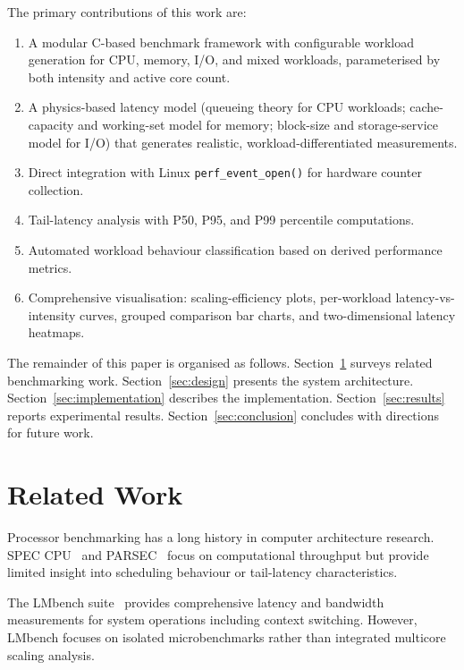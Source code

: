 \documentclass[conference]{IEEEtran}
\begin{document}
The primary contributions of this work are:
\begin{enumerate}
  \item A modular C-based benchmark framework with configurable workload
        generation for CPU, memory, I/O, and mixed workloads, parameterised by
        both intensity and active core count.
  \item A physics-based latency model (queueing theory for CPU workloads;
        cache-capacity and working-set model for memory; block-size and
        storage-service model for I/O) that generates realistic,
        workload-differentiated measurements.
  \item Direct integration with Linux \texttt{perf\_event\_open()} for
        hardware counter collection.
  \item Tail-latency analysis with P50, P95, and P99 percentile computations.
  \item Automated workload behaviour classification based on derived performance
        metrics.
  \item Comprehensive visualisation: scaling-efficiency plots, per-workload
        latency-vs-intensity curves, grouped comparison bar charts, and
        two-dimensional latency heatmaps.
\end{enumerate}

The remainder of this paper is organised as follows.
Section~\ref{sec:related} surveys related benchmarking work.
Section~\ref{sec:design} presents the system architecture.
Section~\ref{sec:implementation} describes the implementation.
Section~\ref{sec:results} reports experimental results.
Section~\ref{sec:conclusion} concludes with directions for future work.

\section{Related Work}
\label{sec:related}

Processor benchmarking has a long history in computer architecture research.
SPEC CPU~\cite{spec2017} and PARSEC~\cite{bienia2011parsec} focus on
computational throughput but provide limited insight into scheduling behaviour
or tail-latency characteristics.

The LMbench suite~\cite{mcvoy1996lmbench} provides comprehensive latency
and bandwidth measurements for system operations including context switching.
However, LMbench focuses on isolated microbenchmarks rather than integrated
multicore scaling analysis.
\end{document}
